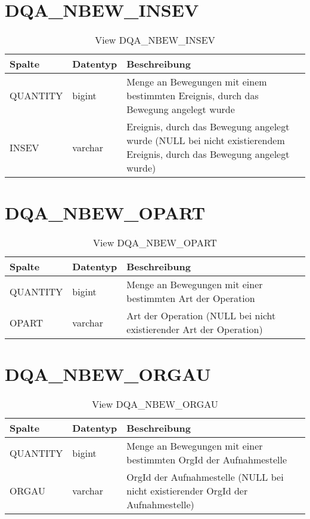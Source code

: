   \section{DQA\_NBEW\_INSEV}

  \begin{table}[ht]
    \centering
    \caption{View DQA\_NBEW\_INSEV}
    \label{tab:dqanbewinsev}
    \begin{tabular}{||l|l|p{10cm}||}
      \hline
      Spalte & Datentyp & Beschreibung \\ [0.5ex] \hline \hline
QUANTITY & bigint & Menge an Bewegungen mit einem bestimmten Ereignis, durch das Bewegung angelegt wurde \\ \hline
INSEV & varchar & Ereignis, durch das Bewegung angelegt wurde (NULL bei nicht existierendem Ereignis, durch das Bewegung angelegt wurde)\\ \hline
    \end{tabular}
  \end{table}
 
  \section{DQA\_NBEW\_OPART}

  \begin{table}[ht]
    \centering
    \caption{View DQA\_NBEW\_OPART}
    \label{tab:dqanbewopart}
    \begin{tabular}{||l|l|p{10cm}||}
      \hline
      Spalte & Datentyp & Beschreibung \\ [0.5ex] \hline \hline
QUANTITY & bigint & Menge an Bewegungen mit einer bestimmten Art der Operation \\ \hline
OPART & varchar & Art der Operation (NULL bei nicht existierender Art der Operation)\\ \hline
    \end{tabular}
  \end{table}
\clearpage
  \section{DQA\_NBEW\_ORGAU}

  \begin{table}[ht]
    \centering
    \caption{View DQA\_NBEW\_ORGAU}
    \label{tab:dqanbeworgau}
    \begin{tabular}{||l|l|p{10cm}||}
      \hline
      Spalte & Datentyp & Beschreibung \\ [0.5ex] \hline \hline
QUANTITY & bigint & Menge an Bewegungen mit einer bestimmten OrgId der Aufnahmestelle \\ \hline
ORGAU & varchar & OrgId der Aufnahmestelle (NULL bei nicht existierender OrgId der Aufnahmestelle)\\ \hline
    \end{tabular}
  \end{table}

